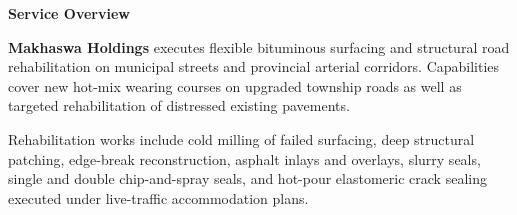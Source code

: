\documentclass[a4paper,11pt]{article}
\begin{document}
\noindent
\begin{minipage}[t]{0.63\textwidth}
    \vspace{0pt}
    {\large\bfseries\color{mhnavy} Service Overview}
    \vspace{0.08cm}

    {\fontsize{8.7pt}{12.3pt}\selectfont\color{mhtext}
    \textbf{Makhaswa Holdings} executes flexible bituminous surfacing and structural road rehabilitation on municipal streets and provincial arterial corridors. Capabilities cover new hot-mix wearing courses on upgraded township roads as well as targeted rehabilitation of distressed existing pavements.
    }

    \vspace{0.15cm}

    {\fontsize{8.7pt}{12.3pt}\selectfont\color{mhtext}
    Rehabilitation works include cold milling of failed surfacing, deep structural patching, edge-break reconstruction, asphalt inlays and overlays, slurry seals, single and double chip-and-spray seals, and hot-pour elastomeric crack sealing executed under live-traffic accommodation plans.
    }
\end{minipage}
\hfill
\end{document}
